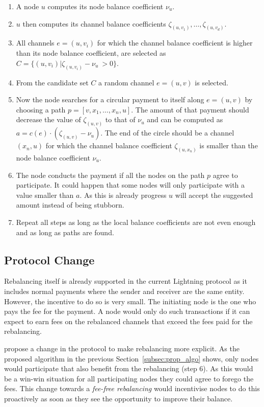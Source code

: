 \documentclass[final]{fhnwreport}       %
\begin{document}
\begin{enumerate}
\item A node $u$ computes its node balance coefficient $\nu_u$.
\item $u$ then computes its channel balance coefficients $\zeta_{(u,v_1)},\dots,\zeta_{(u,v_d)}$.
\item All channels $e=(u,v_i)$ for which the channel balance coefficient is higher 
than its node balance coefficient, are selected as $C = \{(u,v_i) | \zeta_{(u,v_i)} - \nu_u\ > 0\}$.
\item From the candidate set $C$ a random channel $e=(u,v)$ is selected.
\item Now the node searches for a circular payment to itself along $e=(u,v)$ by choosing a path $p = [v,x_1,\dots,x_n,u]$. The amount of that payment should decrease the value of $\zeta_{(u,v)}$ to that of $\nu_u$ and can be computed as $a = c(e)\cdot (\zeta_{(u,v)}-\nu_u)$. The end of the circle should be a channel $(x_n,u)$ for which the channel balance coefficient $\zeta_{(u,x_n)}$ is smaller than the node balance coefficient $\nu_u$.
\item The node conducts the payment if all the nodes on the path $p$ agree to participate. It could happen that some nodes will only participate with a value smaller than $a$. As this is already progress $u$ will accept the suggested amount instead of being stubborn. 
\item Repeat all steps as long as the local balance coefficients are not even enough and as long as paths are found.
\end{enumerate}

\subsection{Protocol Change}
Rebalancing itself is already supported in the current Lightning protocol as it includes normal payments where the sender and receiver are the same entity. However, the incentive to do so is very small. The initiating node is the one who pays the fee for the payment. A node would only do such transactions if it can expect to earn fees on the rebalanced channels that exceed the fees paid for the rebalancing. 

\textcite{pickhardt_imbalance_2019} propose a change in the protocol to make rebalancing more explicit. As the proposed algorithm in the previous Section~\ref{subsec:prop_algo} shows, only nodes would participate that also benefit from the rebalancing (step 6). As this would be a win-win situation for all participating nodes they could agree to forego the fees. This change towards a \emph{fee-free rebalancing} would incentivise nodes to do this proactively as soon as they see the opportunity to improve their balance.
\end{document}
